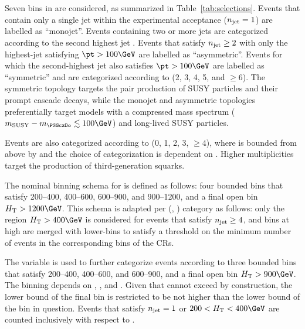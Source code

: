 Seven bins in \njet are considered, as summarized in
Table~\ref{tab:selections}. Events that contain only a single jet
within the experimental acceptance ($n_{\text{jet}} = 1$) are labelled as
``monojet''. Events containing two or more jets are categorized
according to the second highest jet \pt. Events that satisfy $n_{\text{jet}}
\geq 2$ with only the highest-\pt jet satisfying $\pt > 100\GeV$ are
labelled as ``asymmetric''. Events for which the second-highest jet
\pt also satisfies $\pt > 100\GeV$ are labelled as ``symmetric'' and
are categorized according to \njet (2, 3, 4, 5, and ${\geq}6$). The
symmetric topology targets the pair production of SUSY particles and
their prompt cascade decays, while the monojet and asymmetric
topologies preferentially target models with a compressed mass
spectrum ($m_\text{SUSY} - m_{\PSGczDo} \lesssim 100\GeV$) and
long-lived SUSY particles.

Events are also categorized according to \nb (0, 1, 2, 3, ${\geq}4$),
where \nb is bounded from above by \njet and the choice of
categorization is dependent on \njet. Higher \nb multiplicities target
the production of third-generation squarks.

The nominal binning schema for \scalht is defined as follows: four
bounded bins that satisfy 200--400, 400--600, 600--900, and
900--1200\GeV, and a final open bin $\scalht > 1200\GeV$. This schema
is adapted per (\njet, \nb) category as follows: only the region
$\scalht > 400\GeV$ is considered for events that satisfy $n_{\text{jet}} \geq
4$, and bins at high \scalht are merged with lower-\scalht bins to
satisfy a threshold on the minimum number of events in the
corresponding bins of the CRs. 

The \mht variable is used to further categorize events according to
three bounded bins that satisfy 200--400, 400--600, and 600--900, and
a final open bin $\scalht > 900\GeV$. The \mht binning depends on
\njet, \nb, and \scalht. Given that \mht cannot exceed \scalht by
construction, the lower bound of the final \mht bin is restricted to
be not higher than the lower bound of the \scalht bin in
question. Events that satisfy $n_{\text{jet}} = 1$ or $200 < \scalht < 400\GeV$
are counted inclusively with respect to \mht.

